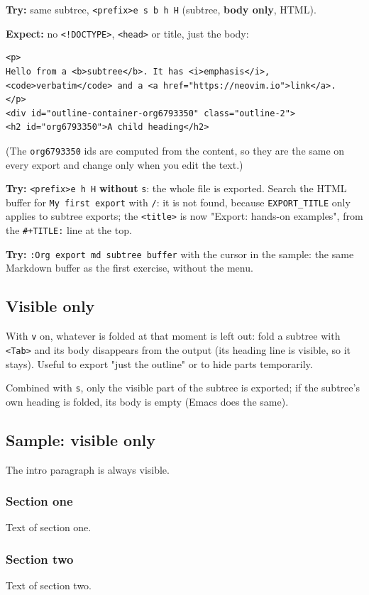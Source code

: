 \textbf{Try:} same subtree, \texttt{<prefix>e s b h H} (subtree, \textbf{body only}, HTML).

\textbf{Expect:} no \texttt{<!DOCTYPE>}, \texttt{<head>} or title, just the body:

\begin{verbatim}
<p>
Hello from a <b>subtree</b>. It has <i>emphasis</i>, <code>verbatim</code> and a <a href="https://neovim.io">link</a>.
</p>
<div id="outline-container-org6793350" class="outline-2">
<h2 id="org6793350">A child heading</h2>
\end{verbatim}

(The \texttt{org6793350} ids are computed from the content, so they are the same
on every export and change only when you edit the text.)

\textbf{Try:} \texttt{<prefix>e h H} \textbf{without} \texttt{s}: the whole file is exported. Search
the HTML buffer for \texttt{My first export} with \texttt{/}: it is not found, because
\texttt{EXPORT\_TITLE} only applies to subtree exports; the \texttt{<title>} is now
"Export: hands-on examples", from the \texttt{\#+TITLE:} line at the top.

\textbf{Try:} \texttt{:Org export md subtree buffer} with the cursor in the sample: the
same Markdown buffer as the first exercise, without the menu.
\subsection{Visible only}
\label{sec:orgd54f3f3}
With \texttt{v} on, whatever is folded at that moment is left out: fold a
subtree with \texttt{<Tab>} and its body disappears from the output (its heading
line is visible, so it stays). Useful to export "just the outline" or to
hide parts temporarily.

Combined with \texttt{s}, only the visible part of the subtree is exported; if
the subtree's own heading is folded, its body is empty (Emacs does the
same).
\subsection{Sample: visible only}
\label{sec:org90eb13a}
The intro paragraph is always visible.
\subsubsection{Section one}
\label{sec:orge5cb850}
Text of section one.
\subsubsection{Section two}
\label{sec:org2339d7e}
Text of section two.
